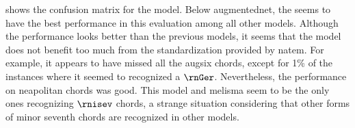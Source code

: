 
 shows the confusion
matrix for the \textcite{mcleod2021modular} model. Below
\gls{augmentednet}, the \textcite{mcleod2021modular} seems
to have the best performance in this evaluation among all
other models. Although the performance looks better than the
previous models, it seems that the model does not benefit
too much from the standardization provided by \gls{natem}.
For example, it appears to have missed all the \gls{augsix}
chords, except for 1\% of the instances where it seemed to
recognized a $\rnGer$. Nevertheless, the performance on
\gls{neapolitan} chords was good. This model and
\gls{melisma} seem to be the only ones recognizing $\rnisev$
chords, a strange situation considering that other forms of
minor seventh chords are recognized in other models.

